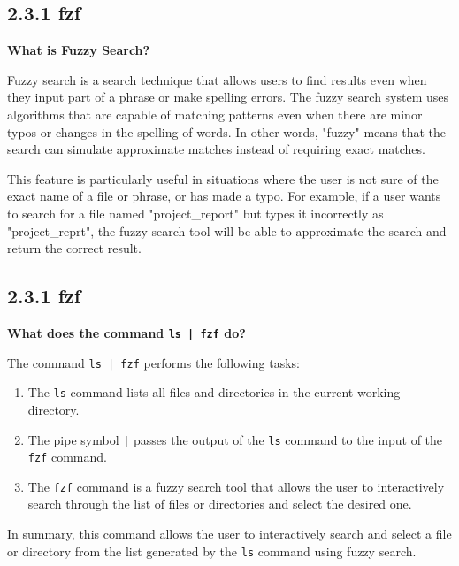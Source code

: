 \documentclass{article}
\begin{document}
\subsection*{2.3.1 fzf}

\textbf{What is Fuzzy Search?}

Fuzzy search is a search technique that allows users to find results even when they input part of a phrase or make spelling errors. The fuzzy search system uses algorithms that are capable of matching patterns even when there are minor typos or changes in the spelling of words. In other words, "fuzzy" means that the search can simulate approximate matches instead of requiring exact matches.

This feature is particularly useful in situations where the user is not sure of the exact name of a file or phrase, or has made a typo. For example, if a user wants to search for a file named "project\_report" but types it incorrectly as "project\_reprt", the fuzzy search tool will be able to approximate the search and return the correct result.







\subsection*{2.3.1 fzf}

\textbf{What does the command \texttt{ls | fzf} do?}

The command \texttt{ls | fzf} performs the following tasks:

\begin{enumerate}
    \item The \texttt{ls} command lists all files and directories in the current working directory.
    \item The pipe symbol \texttt{|} passes the output of the \texttt{ls} command to the input of the \texttt{fzf} command.
    \item The \texttt{fzf} command is a fuzzy search tool that allows the user to interactively search through the list of files or directories and select the desired one.
\end{enumerate}

In summary, this command allows the user to interactively search and select a file or directory from the list generated by the \texttt{ls} command using fuzzy search.
\end{document}

